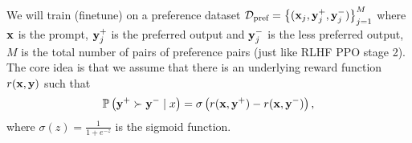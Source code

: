 \documentclass[11pt]{article}  %
\begin{document}
We will train (finetune) on a preference dataset $\mathcal{D}_{\text{pref}} = \left\{ (\mathbf{x}_j, \mathbf{y}_j^+, \mathbf{y}_j^-) \right\}_{j=1}^M$ where $\mathbf{x}$ is the prompt, $\mathbf{y}_j^+$ is the preferred output and $\mathbf{y}_j^-$ is the less preferred output, $M$ is the total number of pairs of preference pairs (just like RLHF PPO stage 2).
The core idea is that we assume that there is an underlying reward function $r(\mathbf{x}, \mathbf{y})$ such that 
\begin{align*}
  \mathbb{P}\left( \mathbf{y}^{+} \succ \mathbf{y}^{-} \mid x \right) = \sigma\left( r(\mathbf{x}, \mathbf{y}^{+}) - r(\mathbf{x}, \mathbf{y}^{-}) \right), 
\end{align*}
where $\sigma(z) = \frac{1}{1 + e^{-z}}$ is the sigmoid function.
\end{document}

